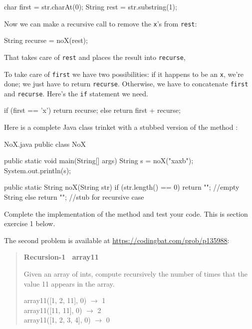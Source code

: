 \begin{code}
char first = str.charAt(0);
String rest = str.substring(1);
\end{code}

Now we can make a recursive call to remove the {\tt x}'s from {\tt rest}:

\begin{code}
String recurse = noX(rest);
\end{code}

That takes care of {\tt rest} and places the result into {\tt recurse},

To take care of {\tt first} we have two possibilities: if it happens to be an {\tt x}, we're done; we just have to return {\tt recurse}.  Otherwise, we have to concatenate {\tt first} and {\tt recurse}.  Here's the {\tt if} statement we need.

\begin{code}
if (first == 'x') {
    return recurse;
} else {
    return first + recurse;
}
\end{code}

Here is a complete Java class trinket with a stubbed version of the method :

\begin{trinket} [270] {NoX.java}
public class NoX {

    public static void main(String[] args) {
       String s = noX("xaxb");
       System.out.println(s);
    }
    
    public static String noX(String str) {
        if (str.length() == 0) {
           return ""; //empty String
        } else {
           return ""; //stub for recursive case
        }
    }
}
\end{trinket}

Complete the implementation of the  method and test your code.  This is section exercise 1 below.

The second problem is available at \url{https://codingbat.com/prob/p135988}:

\begin{quote}
\textbf{Recursion-1 ~array11}

Given an array of ints, compute recursively the number of times that the value 11 appears in the array.

\ttfamily
array11([1, 2, 11], 0) $\rightarrow$ 1 \\
array11([11, 11], 0) $\rightarrow$ 2 \\
array11([1, 2, 3, 4], 0) $\rightarrow$ 0
\end{quote}

